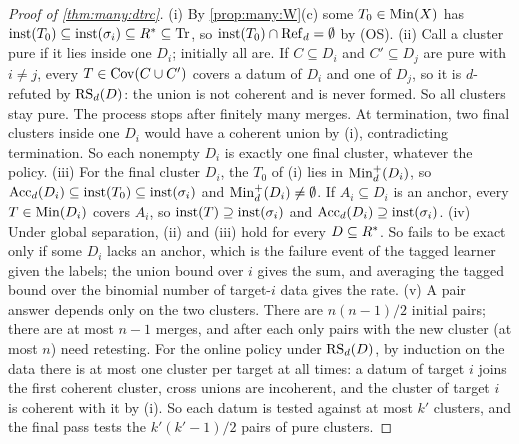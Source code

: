 \begin{proof}[Proof of \cref{thm:many:dtrc}]
(i) By \cref{prop:many:W}(c) some $T_0\in\mathrm{Min}(X)$ has $\mathrm{inst}(T_0)\subseteq\mathrm{inst}(\sigma_i)\subseteq R^{*}\subseteq\mathrm{Tr}$,
so $\mathrm{inst}(T_0)\cap\mathrm{Ref}_d=\emptyset$ by (OS).
(ii) Call a cluster pure if it lies inside one $D_i$; initially all are. If $C\subseteq D_i$ and $C'\subseteq D_j$ are pure
with $i\neq j$, every $T\in\mathrm{Cov}(C\cup C')$ covers a datum of $D_i$ and one of $D_j$, so it is $d$-refuted by $\mathrm{RS}_d(D)$:
the union is not coherent and is never formed. So all clusters stay pure. The process stops after finitely many merges.
At termination, two final clusters inside one $D_i$ would have a coherent union by (i), contradicting termination. So
each nonempty $D_i$ is exactly one final cluster, whatever the policy.
(iii) For the final cluster $D_i$, the $T_0$ of (i) lies in $\mathrm{Min}_d^+(D_i)$, so $\mathrm{Acc}_d(D_i)\subseteq\mathrm{inst}(T_0)\subseteq
\mathrm{inst}(\sigma_i)$ and $\mathrm{Min}^+_d(D_i)\neq\emptyset$. If $A_i\subseteq D_i$ is an anchor, every $T\in\mathrm{Min}(D_i)$ covers $A_i$, so
$\mathrm{inst}(T)\supseteq\mathrm{inst}(\sigma_i)$ and $\mathrm{Acc}_d(D_i)\supseteq\mathrm{inst}(\sigma_i)$.
(iv) Under global separation, (ii) and (iii) hold for every $D\subseteq R^{*}$. So \DTRC{} fails to be exact only if some
$D_i$ lacks an anchor, which is the failure event of the tagged learner given the labels; the union bound over $i$ gives
the sum, and averaging the tagged bound over the binomial number of target-$i$ data gives the rate.
(v) A pair answer depends only on the two clusters. There are $n(n-1)/2$ initial pairs; there are at most $n-1$ merges,
and after each only pairs with the new cluster (at most $n$) need retesting. For the online policy under $\mathrm{RS}_d(D)$, by
induction on the data there is at most one cluster per target at all times: a datum of target $i$ joins the first coherent
cluster, cross unions are incoherent, and the cluster of target $i$ is coherent with it by (i). So each datum is tested
against at most $k'$ clusters, and the final pass tests the $k'(k'-1)/2$ pairs of pure clusters.
\end{proof}

